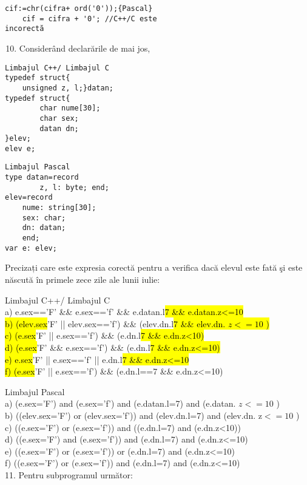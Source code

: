 \begin{verbatim}
cif:=chr(cifra+ ord('0'));{Pascal}
    cif = cifra + '0'; //C++/C este
incorectă
\end{verbatim}

\begin{enumerate}
  \setcounter{enumi}{9}
  \item Considerând declarările de mai jos,
\end{enumerate}

\begin{verbatim}
Limbajul C++/ Limbajul C
typedef struct{
    unsigned z, l;}datan;
typedef struct{
        char nume[30];
        char sex;
        datan dn;
}elev;
elev e;
\end{verbatim}

\begin{verbatim}
Limbajul Pascal
type datan=record
        z, l: byte; end;
elev=record
    nume: string[30];
    sex: char;
    dn: datan;
    end;
var e: elev;
\end{verbatim}

Precizați care este expresia corectă pentru a verifica dacă elevul este fată şi este născută în primele zece zile ale lunii iulie:

Limbajul C++/ Limbajul C\\
a) e.sex=='F' \&\& e.sex=='f' \&\& e.datan.l\hl{7 \&\& e.datan.z<=10\\
b) (elev.sex}'F' || elev.sex=='f') \&\& (elev.dn.l\hl{7 \&\& elev.dn. $z<=10$ )\\
c) (e.sex}'F' || e.sex=='f') \&\& (e.dn.l\hl{7 \&\& e.dn.z<10)\\
d) (e.sex}'F' \&\& e.sex=='f') \&\& (e.dn.l\hl{7 \&\& e.dn.z<=10)\\
e) e.sex}'F' || e.sex=='f' || e.dn.l\hl{7 \&\& e.dn.z<=10\\
f) (e.sex}'F' || e.sex=='f') \&\& (e.dn.l==7 \&\& e.dn.z<=10)

Limbajul Pascal\\
a) (e.sex='F') and (e.sex='f') and (e.datan.l=7) and (e.datan. $z<=10$ )\\
b) ((elev.sex='F') or (elev.sex='f')) and (elev.dn.l=7) and (elev.dn. $\mathrm{z}<=10$ )\\
c) ((e.sex='F') or (e.sex='f')) and ((e.dn.l=7) and (e.dn.z<10))\\
d) ((e.sex='F') and (e.sex='f')) and (e.dn.l=7) and (e.dn.z<=10)\\
e) ((e.sex='F') or (e.sex='f')) or (e.dn.l=7) and (e.dn.z<=10)\\
f) ((e.sex='F') or (e.sex='f')) and (e.dn.l=7) and (e.dn.z<=10)\\
11. Pentru subprogramul următor:

